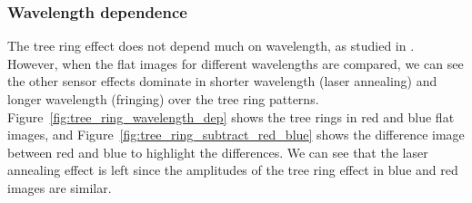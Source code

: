 \subsubsection{Wavelength dependence}
The tree ring effect does not depend much on wavelength, as studied in \citep{2017Jinst..12C05015,2020JATIS...6a1005P}. However, when the flat images for different wavelengths are compared, we can see the other sensor effects dominate in shorter wavelength (laser annealing) and longer wavelength (fringing) over the tree ring patterns. Figure~\ref{fig:tree_ring_wavelength_dep} shows the tree rings in red and blue flat images, and Figure~\ref{fig:tree_ring_subtract_red_blue} shows the difference image between red and blue to highlight the differences. We can see that the laser annealing effect is left since the amplitudes of the tree ring effect in blue and red images are similar.

